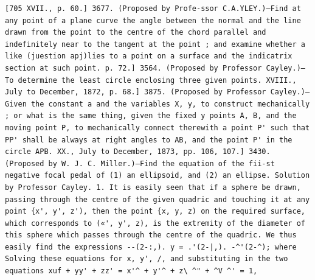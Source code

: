 \documentclass[11pt,a4paper]{book}
\begin{document}
\newpage
\setcounter{page}{576}
\begin{verbatim}
[705 XVII., p. 60.] 3677. (Proposed by Profe-ssor C.A.YLEY.)—Find at any point of a plane curve the angle between the normal and the line drawn from the point to the centre of the chord parallel and indefinitely near to the tangent at the point ; and examine whether a like (juestion apj)lies to a point on a surface and the indicatrix section at such point. p. 72.] 3564. (Proposed by Professor Cayley.)—To determine the least circle enclosing three given points. XVIII., July to December, 1872, p. 68.] 3875. (Proposed by Professor Cayley.)—Given the constant a and the variables X, y, to construct mechanically ; or what is the same thing, given the fixed y points A, B, and the moving point P, to mechanically connect therewith a point P' such that PP' shall be always at right angles to AB, and the point P' in the circle APB. XX., July to December, 1873, pp. 106, 107.] 3430. (Proposed by W. J. C. Miller.)—Find the equation of the fii-st negative focal pedal of (1) an ellipsoid, and (2) an ellipse. Solution by Professor Cayley. 1. It is easily seen that if a sphere be drawn, passing through the centre of the given quadric and touching it at any point {x', y', z'), then the point {x, y, z) on the required surface, which corresponds to («', y', z), is the extremity of the diameter of this sphere which passes through the centre of the quadric. We thus easily find the expressions --(2-:,). y = .'(2-|,). -^'(2-^); where Solving these equations for x, y', /, and substituting in the two equations xuf + yy' + zz' = x'^ + y'^ + z\ ^" + ^V ^' = 1, 
\end{verbatim}
\end{document}
